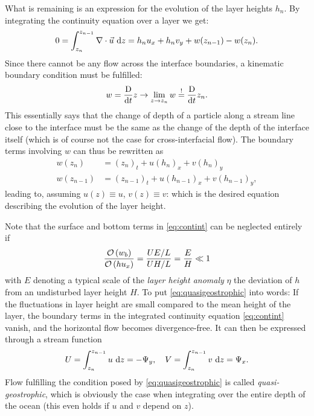 What is remaining is an expression for the evolution of the layer heights \(h_n\). By integrating the continuity equation over a layer we get:
%
\begin{equation}
0 = \int_{z_{n}}^{z_{n-1}} \nabla \cdot \vec{u} ~\text{d}z = h_nu_x + h_nv_y + w(z_{n-1}) - w(z_n). \label{eq:contint}
\end{equation}
%
Since there cannot be any flow across the interface boundaries, a kinematic boundary condition must be fulfilled:
%
\begin{equation}
w = \frac{\text{D}}{\text{d}t} z \rightarrow \lim_{z \to z_n} w \overset{!}{=} \frac{\text{D}}{\text{d}t} z_n.
\end{equation}
%
This essentially says that the change of depth of a particle along a stream line close to the interface must be the same as the change of the depth of the interface itself (which is of course not the case for cross-interfacial flow). The boundary terms involving \(w\) can thus be rewritten as
%
\begin{align}
w(z_n) &= (z_n)_t + u(h_n)_x + v(h_n)_y \\
w(z_{n-1}) &= (z_{n-1})_t + u(h_{n-1})_x + v(h_{n-1})_y,
\label{eq:wbottom} 
\end{align}
%
leading to, assuming \(u(z) \equiv u\), \(v(z) \equiv v\):
%
%
which is the desired equation describing the evolution of the layer height.

\parabreak

Note that the surface and bottom terms in \eqref{eq:contint} can be neglected entirely if
%
\begin{equation}
\frac{\mathcal{O}\left(w_b\right)}{\mathcal{O}\left(hu_x\right)} = \frac{U E / L}{U H / L} = \frac{E}{H} \ll 1
\label{eq:quasigeostrophic}
\end{equation}
%
with \(E\) denoting a typical scale of the \emph{layer height anomaly} \(\eta\) \ie the deviation of \(h\) from an undisturbed layer height \(H\). To put \eqref{eq:quasigeostrophic} into words: If the fluctuations in layer height are small compared to the mean height of the layer, the boundary terms in the integrated continuity equation \eqref{eq:contint} vanish, and the horizontal flow becomes divergence-free. It can then be expressed through a stream function
%
\begin{equation}
U = \int_{z_{n}}^{z_{n-1}} u ~\text{d}z = -\Psi_y, \quad V = \int_{z_{n}}^{z_{n-1}} v ~\text{d}z = \Psi_x.
\end{equation}
%
Flow fulfilling the condition posed by \eqref{eq:quasigeostrophic} is called \emph{quasi-geostrophic}, which is obviously the case when integrating over the entire depth of the ocean (this even holds if \(u\) and \(v\) depend on \(z\)).

